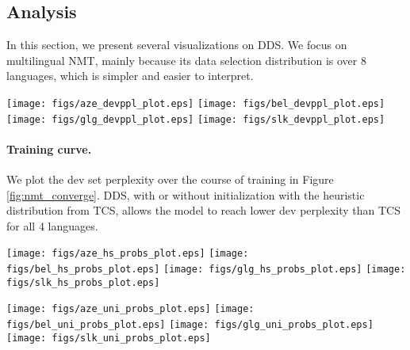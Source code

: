 \subsection{\label{sec:analysis} Analysis}
In this section, we present several visualizations on DDS. We focus on multilingual NMT, mainly because its data selection distribution is over 8 languages, which is simpler and easier to interpret.  
\begin{center}
  \texttt{[image: figs/aze\_devppl\_plot.eps]}
  \texttt{[image: figs/bel\_devppl\_plot.eps]}
  \texttt{[image: figs/glg\_devppl\_plot.eps]}
  \texttt{[image: figs/slk\_devppl\_plot.eps]}
\end{center}
\paragraph{Training curve.} We plot the dev set perplexity over the course of training in Figure \ref{fig:nmt_converge}. DDS, with or without initialization with the heuristic distribution from TCS, allows the model to reach lower dev perplexity than TCS for all 4 languages.

\begin{center}
  \texttt{[image: figs/aze\_hs\_probs\_plot.eps]}
  \texttt{[image: figs/bel\_hs\_probs\_plot.eps]}
  \texttt{[image: figs/glg\_hs\_probs\_plot.eps]}
  \texttt{[image: figs/slk\_hs\_probs\_plot.eps]}
\end{center}

\begin{center}
  \texttt{[image: figs/aze\_uni\_probs\_plot.eps]}
  \texttt{[image: figs/bel\_uni\_probs\_plot.eps]}
  \texttt{[image: figs/glg\_uni\_probs\_plot.eps]}
  \texttt{[image: figs/slk\_uni\_probs\_plot.eps]}
\end{center}
